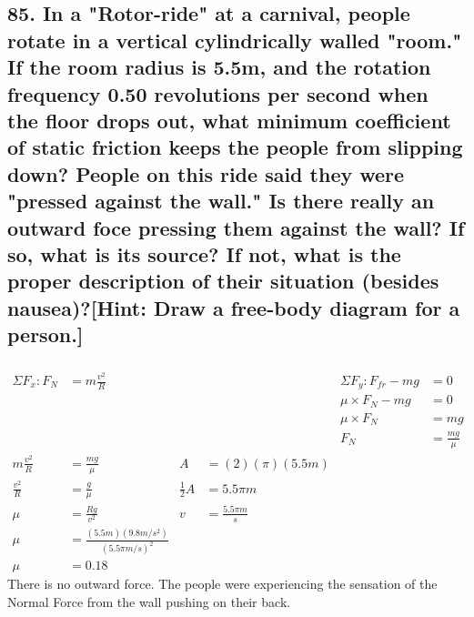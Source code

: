 \documentclass[12pt,a4paper,english]{article}
\begin{document}
\begin{flushleft}
  \subsection{85. In a "Rotor-ride" at a carnival, people rotate in a vertical cylindrically walled "room." If the room radius is 5.5m, and the rotation frequency 0.50 revolutions per second when the floor drops out, what minimum coefficient of static friction keeps the people from slipping down? People on this ride said they were "pressed against the wall." Is there really an outward foce pressing them against the wall? If so, what is its source? If not, what is the proper description of their situation (besides nausea)?[Hint: Draw a free-body diagram for a person.]}
  \begin{align*}
    &&&&&
    \\
    \Sigma F_x: F_N&=m\frac{v^2}{R}&&&\Sigma F_y: F_{fr}-mg&=0
    \\
    &&&&\mu\times F_N-mg&=0
    \\
       &&&&\mu \times F_N&=mg
    \\
    &&&&F_N&=\frac{mg}{\mu}
    \\
    m\frac{v^2}{R}&=\frac{mg}{\mu}
                 &A&=(2)(\pi)(5.5m)
    \\
    \frac{v^2}{R}&=\frac{g}{\mu}
    &\frac{1}{2}A&=5.5\pi m
    \\
    \mu&=\frac{Rg}{v^2}
    &v&=\frac{5.5\pi m}{s}
    \\
    \mu&=\frac{(5.5m)(9.8m/s^2)}{(5.5\pi m/s)^2}
    \\
    \mu&=0.18
  \end{align*}
  There is no outward force. The people were experiencing the sensation of the Normal Force from the wall pushing on their back.
\end{flushleft}
\end{document}
